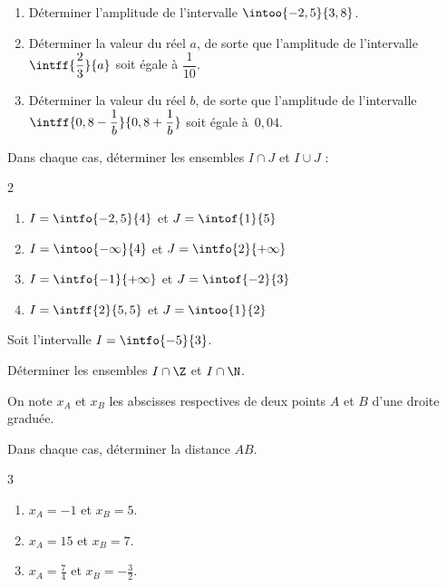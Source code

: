 \exo

\begin{enumerate}
\item Déterminer l'amplitude de l'intervalle $\intoo{-2,5}{3,8}$.
\item Déterminer la valeur du réel $a$, de sorte que l'amplitude de l'intervalle $\intff{\dfrac{2}{3}}{a}$ soit égale à $\dfrac{1}{10}$.
\item Déterminer la valeur du réel $b$, de sorte que l'amplitude de l'intervalle $\intff{0,8-\dfrac{1}{b}}{0,8+\dfrac{1}{b}}$ soit égale à~$0,04$.
\end{enumerate}

\exo

Dans chaque cas, déterminer les ensembles $I\cap J$ et $I\cup J$ :
\vspace{-6pt}
\setlength{\columnsep}{1cm}
\setlength{\columnseprule}{0pt}
\begin{multicols}{2}
\begin{enumerate}
\item $I=\intfo{-2,5}{4}$ et $J=\intof{1}{5}$

\medskip
\item $I=\intoo{-\infty}{4}$ et $J=\intfo{2}{+\infty}$

\medskip
\item $I=\intfo{-1}{+\infty}$ et $J=\intof{-2}{3}$

\medskip
\item $I=\intff{2}{5,5}$ et $J=\intoo{1}{2}$
\end{enumerate}
\end{multicols}

\exo

Soit l'intervalle $I=\intfo{-5}{3}$.

Déterminer les ensembles $I\cap\Z$ et $I\cap\N$.

\exo

On note $x_A$ et $x_B$ les abscisses respectives de deux points $A$ et $B$ d'une droite graduée.

Dans chaque cas, déterminer la distance $AB$.

\vspace{-6pt}
\setlength{\columnsep}{1cm}
\setlength{\columnseprule}{0pt}
\begin{multicols}{3}
\begin{enumerate}
\item $x_A=-1$ et $x_B=5$.
\item $x_A=15$ et $x_B=7$.
\item $x_A=\frac{7}{4}$ et $x_B=-\frac{3}{2}$.
\end{enumerate}
\end{multicols}

